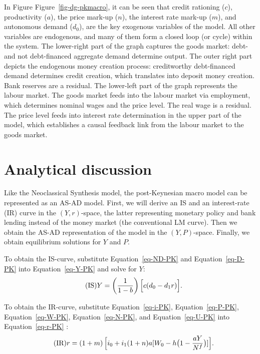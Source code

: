 \documentclass[
  letterpaper,
  DIV=11,
  numbers=noendperiod]{scrreprt}
\begin{document}
In Figure Figure~\ref{fig-dg-pkmacro}, it can be seen that credit
rationing (\(c\)), productivity (\(a\)), the price mark-up (\(n\)), the
interest rate mark-up (\(m\)), and autonomous demand (\(d_0\)), are the
key exogenous variables of the model. All other variables are
endogenous, and many of them form a closed loop (or cycle) within the
system. The lower-right part of the graph captures the goods market:
debt- and not debt-financed aggregate demand determine output. The outer
right part depicts the endogenous money creation process: creditworthy
debt-financed demand determines credit creation, which translates into
deposit money creation. Bank reserves are a residual. The lower-left
part of the graph represents the labour market. The goods market feeds
into the labour market via employment, which determines nominal wages
and the price level. The real wage is a residual. The price level feeds
into interest rate determination in the upper part of the model, which
establishes a causal feedback link from the labour market to the goods
market.

\section{Analytical discussion}\label{analytical-discussion-2}

Like the Neoclassical Synthesis model, the post-Keynesian macro model
can be represented as an AS-AD model. First, we will derive an IS and an
interest-rate (IR) curve in the \((Y, r)\)-space, the latter
representing monetary policy and bank lending instead of the money
market (the conventional LM curve). Then we obtain the AS-AD
representation of the model in the \((Y,P)\)-space. Finally, we obtain
equilibrium solutions for \(Y\) and \(P\).

To obtain the IS-curve, substitute Equation~\ref{eq-ND-PK} and
Equation~\ref{eq-D-PK} into Equation~\ref{eq-Y-PK} and solve for \(Y\):
\begin{align}\label{eq:IS}\tag{IS}
Y&=\left(\frac{1}{1-b}\right)\Bigl[c(d_0 -d_1r)\Bigr].
\end{align}

To obtain the IR-curve, substitute Equation~\ref{eq-i-PK},
Equation~\ref{eq-P-PK}, Equation~\ref{eq-W-PK}, Equation~\ref{eq-N-PK},
and Equation~\ref{eq-U-PK} into Equation~\ref{eq-r-PK} :
\begin{align}\label{eq:IR}\tag{IR}
r&=\left(1+m\right)\Bigl[i_0+i_1(1+n)a[W_0-h\bigl(1-\frac{aY}{N^f}\bigr)]\Bigr].
\end{align}
\end{document}
